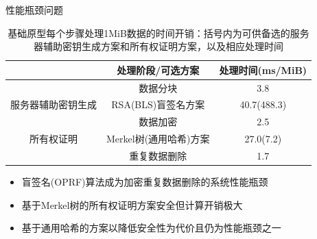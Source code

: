 \documentclass{beamer}
\begin{document}
\begin{frame}{性能瓶颈问题}
    \begin{table}[!htb]
        \small
        \centering
        \caption{基础原型每个步骤处理1MiB数据的时间开销：括号内为可供备选的服务器辅助密钥生成方案和所有权证明方案，以及相应处理时间}
        \label{tab:intro-bottleneck}
        \begin{tabular}{@{}ccc@{}}
            \toprule
                                        & 处理阶段/可选方案            & 处理时间(ms/MiB) \\ \midrule
                                        & 数据分块                     & 3.8              \\
            服务器辅助密钥生成          & RSA(BLS)盲签名方案 & 40.7(488.3)      \\
            \multirow{3}{*}{所有权证明} & 数据加密                     & 2.5              \\
                                        & Merkel树(通用哈希)方案     & 27.0(7.2)        \\
                                        & 重复数据删除                 & 1.7              \\ \bottomrule
        \end{tabular}
    \end{table}
    \begin{itemize}
        \item 盲签名(OPRF)算法成为加密重复数据删除的系统性能瓶颈
        \item 基于Merkel树的所有权证明方案安全但计算开销极大
        \item 基于通用哈希的方案以降低安全性为代价且仍为性能瓶颈之一
    \end{itemize}
\end{frame}
\end{document}

